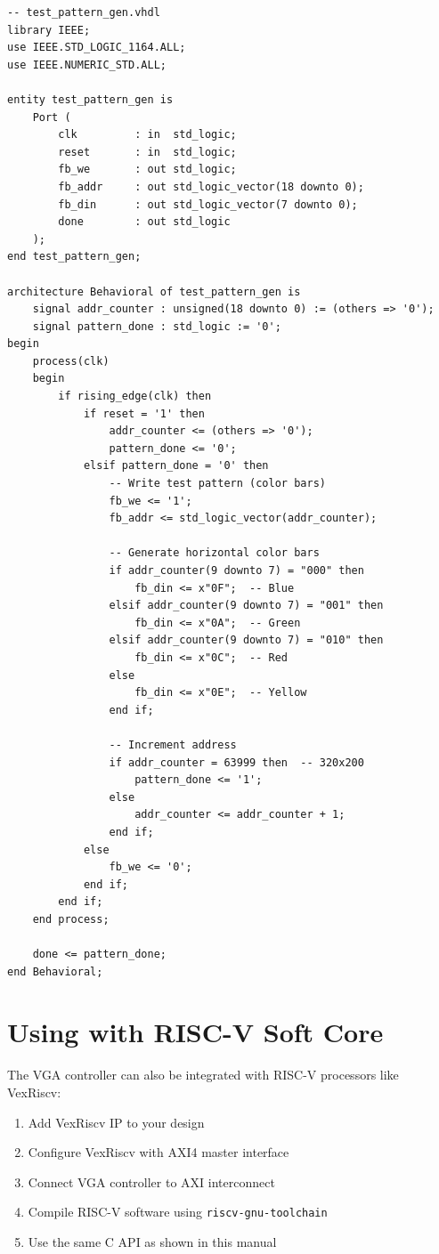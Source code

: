 \documentclass[11pt,letterpaper]{report}
\begin{document}
\begin{lstlisting}[style=vhdl,caption={Simple Test Pattern Generator}]
-- test_pattern_gen.vhdl
library IEEE;
use IEEE.STD_LOGIC_1164.ALL;
use IEEE.NUMERIC_STD.ALL;

entity test_pattern_gen is
    Port (
        clk         : in  std_logic;
        reset       : in  std_logic;
        fb_we       : out std_logic;
        fb_addr     : out std_logic_vector(18 downto 0);
        fb_din      : out std_logic_vector(7 downto 0);
        done        : out std_logic
    );
end test_pattern_gen;

architecture Behavioral of test_pattern_gen is
    signal addr_counter : unsigned(18 downto 0) := (others => '0');
    signal pattern_done : std_logic := '0';
begin
    process(clk)
    begin
        if rising_edge(clk) then
            if reset = '1' then
                addr_counter <= (others => '0');
                pattern_done <= '0';
            elsif pattern_done = '0' then
                -- Write test pattern (color bars)
                fb_we <= '1';
                fb_addr <= std_logic_vector(addr_counter);
                
                -- Generate horizontal color bars
                if addr_counter(9 downto 7) = "000" then
                    fb_din <= x"0F";  -- Blue
                elsif addr_counter(9 downto 7) = "001" then
                    fb_din <= x"0A";  -- Green
                elsif addr_counter(9 downto 7) = "010" then
                    fb_din <= x"0C";  -- Red
                else
                    fb_din <= x"0E";  -- Yellow
                end if;
                
                -- Increment address
                if addr_counter = 63999 then  -- 320x200
                    pattern_done <= '1';
                else
                    addr_counter <= addr_counter + 1;
                end if;
            else
                fb_we <= '0';
            end if;
        end if;
    end process;
    
    done <= pattern_done;
end Behavioral;
\end{lstlisting}

\section{Using with RISC-V Soft Core}

The VGA controller can also be integrated with RISC-V processors like VexRiscv:

\begin{enumerate}
    \item Add VexRiscv IP to your design
    \item Configure VexRiscv with AXI4 master interface
    \item Connect VGA controller to AXI interconnect
    \item Compile RISC-V software using \texttt{riscv-gnu-toolchain}
    \item Use the same C API as shown in this manual
\end{enumerate}
\end{document}
